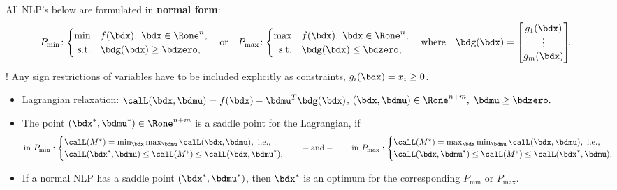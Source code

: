 \documentclass[a4paper]{article}
\begin{document}
  All NLP's below are formulated in \textbf{normal form}:
  \[
    P_{\min}\!:
    \begin{cases}
      \min        & f(\bdx),\; \bdx\in\Rone^n, \\
      \hfill
      \text{s.t.} & \bdg(\bdx)\ge\bdzero,
    \end{cases}
    \quad
    \text{or}
    \quad
    P_{\max}\!:
    \begin{cases}
      \max        & f(\bdx),\; \bdx\in\Rone^n, \\
      \hfill
      \text{s.t.} & \bdg(\bdx)\le\bdzero,
    \end{cases}
    \quad
    \text{where}
    \quad
    \bdg(\bdx)
    =
    \begin{bmatrix}
      g_1(\bdx)\\[-2pt] \vdots\\ g_m(\bdx)
    \end{bmatrix}
    \mkern-6mu.
  \]
 \Obs! %
 Any sign restrictions of variables have
 to be included explicitly as constraints, $g_i(\bdx)=x_i\ge0$.

 \begin{itemize}
   \item Lagrangian relaxation:
    $
      \calL(\bdx,\bdmu)
      = f(\bdx)
      -
      \bdmu^T\bdg(\bdx)
  $,
  $
  (\bdx,\bdmu)\in\Rone^{n+m},\;
    \bdmu\ge\bdzero.
   $

  \item The point $(\bdx^*,\bdmu^*)\in\Rone^{n+m}$ is a saddle point for the Lagrangian, if
    \[
      \text{in}~P_{\min}:
      \begin{cases}
          \calL(M^*) = \min_{\bdx}\max_{\bdmu} \calL(\bdx  ,\bdmu),~\text{i.e.}, \\
          \calL(\bdx^*,\bdmu  ) \le \calL(M^*) \le \calL(\bdx  ,\bdmu^*),
        \end{cases}
        \hspace{1em}
        -\text{and}-
        \hspace{2em}
      \text{in}~P_{\max}:
        \begin{cases}
          \calL(M^*) = \max_{\bdx}\min_{\bdmu} \calL(\bdx  ,\bdmu),~\text{i.e.}, \\
          \calL(\bdx  ,\bdmu^*) \le \calL(M^*) \le \calL(\bdx^*,\bdmu).
      \end{cases}
    \]

    \item If a normal NLP has a saddle point $(\bdx^*,\bdmu^*)$, then $\bdx^*$
    is an optimum for the corresponding
    $P_{\min}$ or
    $P_{\max}$.

 \end{itemize}
\end{document}

